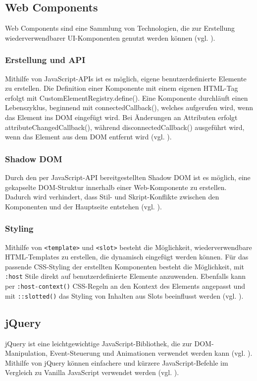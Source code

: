 \documentclass[oneside]{ausarbeitung}
\begin{document}
\subsection{Web Components}
Web Components sind eine Sammlung von Technologien, die zur Erstellung wiederverwendbarer UI-Komponenten genutzt werden können (vgl. \parencite{webcomponents}). 

\subsubsection{Erstellung und API}
Mithilfe von JavaScript-APIs ist es möglich, eigene benutzerdefinierte Elemente zu erstellen. Die Definition einer Komponente mit einem eigenen HTML-Tag erfolgt mit CustomElementRegistry.define(). Eine Komponente durchläuft einen Lebenszyklus, beginnend mit connectedCallback(), welches aufgerufen wird, wenn das Element ins DOM eingefügt wird. Bei Änderungen an Attributen erfolgt attributeChangedCallback(), während disconnectedCallback() ausgeführt wird, wenn das Element aus dem DOM entfernt wird (vgl. \parencite{webcomponents}).

\subsubsection{Shadow DOM}
Durch den per JavaScript-API bereitgestellten Shadow DOM ist es möglich, eine gekapselte DOM-Struktur innerhalb einer Web-Komponente zu erstellen. Dadurch wird verhindert, dass Stil- und Skript-Konflikte zwischen den Komponenten und der Hauptseite entstehen (vgl. \parencite{webcomponents}).

\subsubsection{Styling}
Mithilfe von \texttt{<template>} und \texttt{<slot>} besteht die Möglichkeit, wiederverwendbare HTML-Templates zu erstellen, die dynamisch eingefügt werden können. Für das passende CSS-Styling der erstellten Komponenten besteht die Möglichkeit, mit \texttt{:host} Stile direkt auf benutzerdefinierte Elemente anzuwenden. Ebenfalls kann per \texttt{:host-context()} CSS-Regeln an den Kontext des Elements angepasst und mit \texttt{::slotted()} das Styling von Inhalten aus Slots beeinflusst werden (vgl. \parencite{webcomponents}).


\subsection{jQuery}
jQuery ist eine leichtgewichtige JavaScript-Bibliothek, die zur DOM-Manipulation, Event-Steuerung und Animationen verwendet werden kann (vgl. \parencite{jquery_api}).  
Mithilfe von jQuery können einfachere und kürzere JavaScript-Befehle im Vergleich zu Vanilla JavaScript verwendet werden (vgl. \parencite{jquery-api}).  
\end{document}
